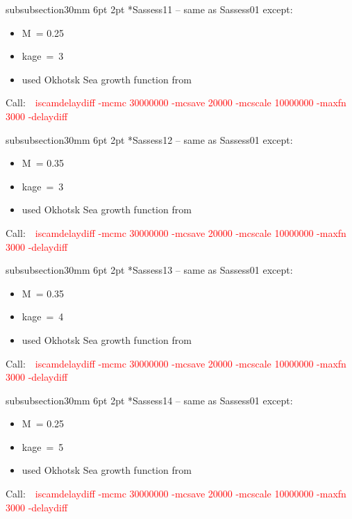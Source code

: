 \documentclass[11pt]{book}
\makeatletter
\newcommand{\red}[1]{{\textcolor{red} {#1}}}
\renewcommand{\subsubsection}{\@startsection%
{subsubsection}{3}{0mm}%
{6pt \@plus -0pt \@minus -0pt}{2pt \@plus 0pt}%
{\normalfont\bf}}%
\newcommand\call[1]{
\footnotesize\selectfont\hangindent=0.35in
Call:~~\red{#1}
\normalsize\selectfont}
\makeatother
\begin{document}
\subsubsection*{Sassess11 -- same as Sassess01 except:}
\begin{itemize}[nosep]
  \item M~= 0.25
  \item kage~=~3
  \item used Okhotsk Sea growth function from \citet{Janusz-Horbowy:1997}
\end{itemize}
\call{iscamdelaydiff -mcmc 30000000 -mcsave 20000 -mcscale 10000000 -maxfn 3000 -delaydiff}

\subsubsection*{Sassess12 -- same as Sassess01 except:}
\begin{itemize}[nosep]
  \item M~= 0.35
  \item kage~=~3
  \item used Okhotsk Sea growth function from \citet{Janusz-Horbowy:1997}
\end{itemize}
\call{iscamdelaydiff -mcmc 30000000 -mcsave 20000 -mcscale 10000000 -maxfn 3000 -delaydiff}

\subsubsection*{Sassess13 -- same as Sassess01 except:}
\begin{itemize}[nosep]
  \item M~= 0.35
  \item kage~=~4
  \item used Okhotsk Sea growth function from \citet{Janusz-Horbowy:1997}
\end{itemize}
\call{iscamdelaydiff -mcmc 30000000 -mcsave 20000 -mcscale 10000000 -maxfn 3000 -delaydiff}

\subsubsection*{Sassess14 -- same as Sassess01 except:}
\begin{itemize}[nosep]
  \item M~= 0.25
  \item kage~=~5
  \item used Okhotsk Sea growth function from \citet{Janusz-Horbowy:1997}
\end{itemize}
\call{iscamdelaydiff -mcmc 30000000 -mcsave 20000 -mcscale 10000000 -maxfn 3000 -delaydiff}
\end{document}
